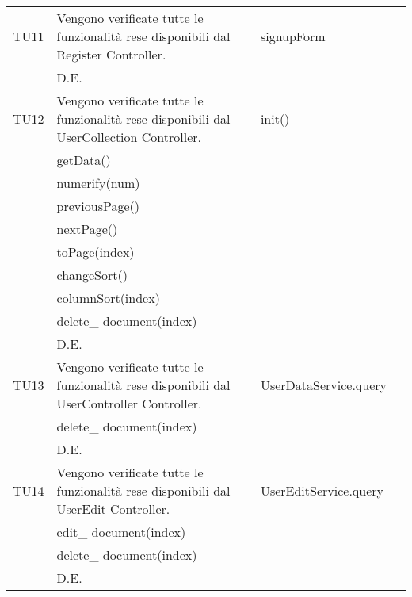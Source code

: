 \begin{center}
\begin{longtable}{|p{2cm}|p{7cm}|p{7cm}|p{2cm}|}
\midrule
TU11
& Vengono verificate tutte le funzionalità rese disponibili dal Register Controller.
& signupForm\\
& D.E.\\


\midrule
TU12
& Vengono verificate tutte le funzionalità rese disponibili dal UserCollection Controller.
& init()\\
& getData()\\
& numerify(num)\\
& previousPage()\\
& nextPage()\\
& toPage(index)\\
& changeSort()\\
& columnSort(index)\\
& delete\_ document(index)\\
& D.E.\\

\midrule
TU13
& Vengono verificate tutte le funzionalità rese disponibili dal UserController Controller.
& UserDataService.query\\
& delete\_ document(index)\\

& D.E.\\

\midrule
TU14
& Vengono verificate tutte le funzionalità rese disponibili dal UserEdit Controller.
& UserEditService.query\\
& edit\_ document(index)\\
& delete\_ document(index)\\

& D.E.\\



\end{longtable}
\end{center}


